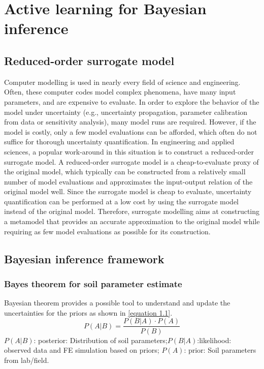 \chapter{Active learning for Bayesian inference}

\section{Reduced-order surrogate model}

Computer modelling is used in nearly every field of science and engineering. Often, these computer codes model complex phenomena, have many input parameters,
and are expensive to evaluate. In order to explore the behavior of the model under uncertainty (e.g., uncertainty propagation, parameter calibration from data or sensitivity analysis), many
model runs are required. However, if the model is costly, only a few model evaluations can be afforded, which often do not suffice for thorough uncertainty quantification. In engineering and applied sciences, a popular work-around in this situation is to construct a reduced-order surrogate model. A reduced-order surrogate model is a cheap-to-evaluate proxy of the original model, which typically can be constructed from a relatively small number of model evaluations and approximates
the input-output relation of the original model well. Since the surrogate model is cheap to evaluate, uncertainty quantification can be performed at a low cost by using the surrogate
model instead of the original model. Therefore, surrogate modelling aims at constructing a metamodel that provides an accurate approximation to the original model while requiring as few model evaluations as possible for its construction.

\section{Bayesian inference framework}

\subsection{Bayes theorem for soil parameter estimate}

Bayesian theorem provides a possible tool to understand and update the uncertainties for the priors as shown in \cref{equation 1.1}.
\begin{equation}
P(A|B) = \frac{{P(B|A) \cdot P(A)}}{{P(B)}} \label{equation 1.1}
\end{equation}
$P(A|B)$: posterior: Distribution of soil parameters;$P(B|A)$:likelihood: observed data and FE simulation based on priors; $P(A)$: prior: Soil parameters from lab/field.

